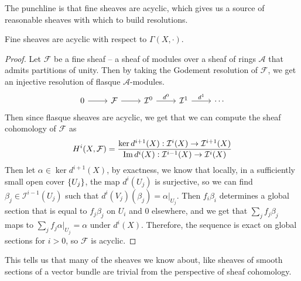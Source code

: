 %
The punchline is that fine sheaves are acyclic, which gives us a source of reasonable
sheaves with which to build resolutions.
%
\begin{thm}
Fine sheaves are acyclic with respect to $\Gamma(X,\cdot)$.
\end{thm}
%
\begin{proof}
Let $\mathcal{F}$ be a fine sheaf -- a sheaf of modules over a sheaf of rings
$\mathcal{A}$ that admits partitions of unity. Then by taking the
Godement resolution of $\mathcal{F}$, we get an injective resolution of
flasque $\mathcal{A}$-modules.
\[\begin{tikzcd}
0 \ar[r] & \mathcal{F} \ar[r] & \mathcal{I}^0 \ar[r, "d^0"] & \mathcal{I}^1 \ar[r, "d^1"]
& \cdots
\end{tikzcd}\]
Then since flasque sheaves are acyclic, we get that we can compute the sheaf
cohomology of $\mathcal{F}$ as
\[
H^i(X, \mathcal{F})
= \frac{\ker d^{i+1}(X) : \mathcal{I}^i(X) \to \mathcal{I}^{i+1}(X)}
{\operatorname{Im} d^i(X) : \mathcal{I}^{i-1}(X) \to \mathcal{I}^i(X)}
\]
Then let $\alpha \in \ker d^{i+1}(X)$, by exactness, we know that locally, in a
sufficiently small open cover $\left\lbrace U_j \right\rbrace$, the map $d^{i}(U_j)$ is surjective,
so we can find $\beta_j \in \mathcal{I}^{i-1}(U_j)$ such that
$d^i(V_j)(\beta_j) = \alpha\vert_{U_j}$. Then $f_i\beta_i$ determines a global
section that is equal to $f_j\beta_j$ on $U_i$ and $0$ elsewhere, and we get that
$\sum_jf_j\beta_j$ maps to $\sum_j f_j\alpha\vert_{U_j} = \alpha$ under $d^i(X)$.
Therefore, the sequence is exact on global sections for $i > 0$, so $\mathcal{F}$
is acyclic.
\end{proof}
%
This tells us that many of the sheaves we know about, like sheaves of smooth sections
of a vector bundle are trivial from the perspective of sheaf cohomology.
%
